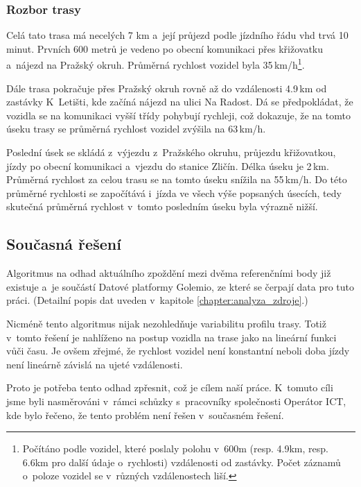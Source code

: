 \subsubsection{Rozbor trasy}

Celá tato trasa má necelých 7 km a~její průjezd podle jízdního řádu \gls{vhd} trvá 10 minut. Prvních 600 metrů je vedeno po obecní komunikaci přes křižovatku a~nájezd na Pražský okruh. Průměrná rychlost vozidel byla 35\,km/h\footnote{Počítáno podle vozidel, které poslaly polohu v~600m (resp. 4.9km, resp. 6.6km pro další údaje o~rychlosti) vzdálenosti od zastávky. Počet záznamů o~poloze vozidel se v~různých vzdálenostech liší.}.

\bigbreak

Dále trasa pokračuje přes Pražský okruh rovně až do vzdálenosti 4.9\,km od zastávky K~Letišti, kde začíná nájezd na ulici Na Radost. Dá se předpokládat, že vozidla se na komunikaci vyšší třídy pohybují rychleji, což dokazuje, že na tomto úseku trasy se průměrná rychlost vozidel zvýšila na 63\,km/h.

\bigbreak

Poslední úsek se skládá z~výjezdu z~Pražského okruhu, průjezdu křižovatkou, jízdy po obecní komunikaci a~vjezdu do stanice Zličín. Délka úseku je 2\,km. Průměrná rychlost za celou trasu se na tomto úseku snížila na 55\,km/h. Do této průměrné rychlosti se započítává i~jízda ve všech výše popsaných úsecích, tedy skutečná průměrná rychlost v~tomto posledním úseku byla výrazně nižší.


\subsection{Současná řešení} \label{subsection:soucasna_reseni_odhadu}

Algoritmus na odhad aktuálního zpoždění mezi dvěma referenčními body již existuje a~je součástí Datové platformy Golemio, ze které se čerpají data pro tuto práci. (Detailní popis dat uveden v~kapitole \ref{chapter:analyza_zdroje}.)

\bigbreak

Nicméně tento algoritmus nijak nezohledňuje variabilitu profilu trasy. Totiž v~tomto řešení je nahlíženo na postup vozidla na trase jako na lineární funkci vůči času. Je ovšem zřejmé, že rychlost vozidel není konstantní neboli doba jízdy není lineárně závislá na ujeté vzdálenosti.

\bigbreak

Proto je potřeba tento odhad zpřesnit, což je cílem naší práce. K~tomuto cíli jsme byli nasměrováni v~rámci schůzky s~pracovníky společnosti Operátor ICT, kde bylo řečeno, že tento problém není řešen v~současném řešení.

